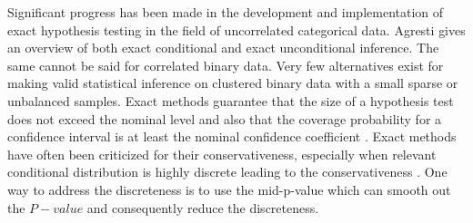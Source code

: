\documentclass[12pt,oneside]{report}
\theoremstyle{definition}
\theoremstyle{mystyle}
\begin{document}
Significant progress has been made in the  development and implementation of exact hypothesis testing  in the field of uncorrelated categorical data. Agresti \cite{Agresti2001} gives an overview of   both exact conditional and exact unconditional inference. The same cannot be said  for correlated binary data. Very few alternatives exist for making valid statistical inference on clustered binary data with  a small sparse or unbalanced samples. Exact methods guarantee that the size of a hypothesis test does not exceed the nominal level and also that the coverage probability for a confidence interval is at least  the nominal confidence coefficient \cite{Agresti2001}. Exact methods have often been criticized  for their conservativeness, especially  when  relevant conditional distribution is highly discrete leading to the conservativeness \cite{Agresti2001}. One way to address the discreteness is to use the mid-p-value which can smooth out  the $P-value$ and consequently  reduce the discreteness.\\
\end{document}
